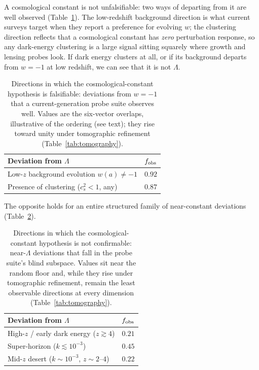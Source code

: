 \documentclass[twocolumn,10pt]{article}
\newcommand{\obs}{f_{\rm obs}}
\begin{document}
A cosmological constant is not unfalsifiable: two ways of departing from it are
well observed (Table~\ref{tab:falsifiable}). The low-redshift background
direction is what current surveys target when they report a preference for
evolving $w$; the clustering direction reflects that a cosmological constant has
\emph{zero} perturbation response, so any dark-energy clustering is a large
signal sitting squarely where growth and lensing probes look. If dark energy
clusters at all, or if its background departs from $w=-1$ at low redshift, we
can see that it is not $\Lambda$.

\begin{table}[t]
\caption{Directions in which the cosmological-constant hypothesis is
falsifiable: deviations from $w=-1$ that a current-generation probe suite
observes well. Values are the six-vector overlaps, illustrative of the ordering
(see text); they rise toward unity under tomographic refinement
(Table~\ref{tab:tomography}).}
\label{tab:falsifiable}
\begin{center}\small
\begin{tabular}{lc}
\hline\hline
Deviation from $\Lambda$ & $\obs$ \\ \hline
Low-$z$ background evolution $w(a)\neq-1$ & $0.92$ \\
Presence of clustering ($c_s^2<1$, any) & $0.87$ \\
\hline\hline
\end{tabular}
\end{center}
\end{table}

The opposite holds for an entire structured family of near-constant deviations
(Table~\ref{tab:blind}).

\begin{table}[t]
\caption{Directions in which the cosmological-constant hypothesis is not
confirmable: near-$\Lambda$ deviations that fall in the probe suite's blind
subspace. Values sit near the random floor and, while they rise under
tomographic refinement, remain the least observable directions at every
dimension (Table~\ref{tab:tomography}).}
\label{tab:blind}
\begin{center}\small
\begin{tabular}{lc}
\hline\hline
Deviation from $\Lambda$ & $\obs$ \\ \hline
High-$z$ / early dark energy ($z\gtrsim4$) & $0.21$ \\
Super-horizon ($k\lesssim10^{-3}$) & $0.45$ \\
Mid-$z$ desert ($k\sim10^{-3}$, $z\sim2$--$4$) & $0.22$ \\
\hline\hline
\end{tabular}
\end{center}
\end{table}
\end{document}
